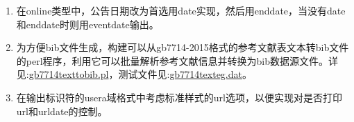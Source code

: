 \begin{enumerate}
\item 在online类型中，公告日期改为首选用date实现，然后用enddate，当没有date和enddate时则用eventdate输出。
    \begin{texlist}
    \end{texlist}

\item 为方便bib文件生成，构建可以从gb7714-2015格式的参考文献表文本转bib文件的perl程序，利用它可以批量解析参考文献信息并转换为bib数据源文件。详见:\href{run:./gb7714texttobib.pl}{gb7714texttobib.pl}，测试文件见:\href{run:./gb7714texteg.dat}{gb7714texteg.dat}。

\item 在输出标识符的usera域格式中考虑标准样式的url选项，以便实现对是否打印url和urldate的控制。
    \begin{texlist}


    \end{texlist}


\end{enumerate}
